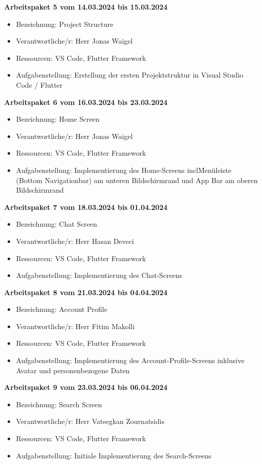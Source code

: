 \newpage
\textbf{Arbeitspaket 5 vom 14.03.2024 bis 15.03.2024}
\begin{itemize}[itemsep=0pt]
    \item{Bezeichnung: Project Structure} 
	\item{Verantwortliche/r: Herr Jonas Waigel} 
	\item{Ressourcen: VS Code, Flutter Framework} 
    \item{Aufgabenstellung: Erstellung der ersten Projektstruktur in Visual Studio Code / Flutter}
\end{itemize}

\textbf{Arbeitspaket 6 vom 16.03.2024 bis 23.03.2024}
\begin{itemize}[itemsep=0pt]
    \item{Bezeichnung: Home Screen} 
	\item{Verantwortliche/r: Herr Jonas Waigel} 
	\item{Ressourcen: VS Code, Flutter Framework} 
    \item{Aufgabenstellung: Implementierung des Home-Screens incl\. Menüleiste (Bottom Navigationbar) am unteren Bildschirmrand und App Bar am oberen Bildschirmrand}
\end{itemize}

\textbf{Arbeitspaket 7 vom 18.03.2024 bis 01.04.2024}
\begin{itemize}[itemsep=0pt]
    \item{Bezeichnung: Chat Screen} 
	\item{Verantwortliche/r: Herr Hasan Deveci} 
	\item{Ressourcen: VS Code, Flutter Framework} 
    \item{Aufgabenstellung: Implementierung des Chat-Screens}
\end{itemize} 

\textbf{Arbeitspaket 8 vom 21.03.2024 bis 04.04.2024}
\begin{itemize}[itemsep=0pt]
    \item{Bezeichnung: Account Profile} 
	\item{Verantwortliche/r: Herr Fitim Makolli} 
	\item{Ressourcen: VS Code, Flutter Framework} 
    \item{Aufgabenstellung: Implementierung des Account-Profile-Screens inklusive Avatar und personenbezogene Daten}
\end{itemize}


\textbf{Arbeitspaket 9 vom 23.03.2024 bis 06.04.2024}
\begin{itemize}[itemsep=0pt]
    \item{Bezeichnung: Search Screen} 
	\item{Verantwortliche/r: Herr Vatsegkan Zournatsidis} 
	\item{Ressourcen: VS Code, Flutter Framework} 
    \item{Aufgabenstellung: Initiale Implementierung des Search-Screens}
\end{itemize}

